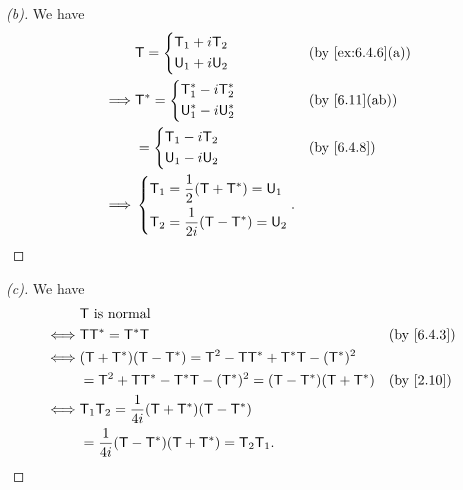 \begin{proof}[(b)]
	We have
	\begin{align*}
		         & \T = \begin{dcases}
			                \T_1 + i \T_2 \\
			                \U_1 + i \U_2
		                \end{dcases}                      &  & \by{ex:6.4.6}[a] \\
		\implies & \T^* = \begin{dcases}
			                  \T_1^* - i \T_2^* \\
			                  \U_1^* - i \U_2^*
		                  \end{dcases}                    &  & \by{6.11}[ab]    \\
		         & = \begin{dcases}
			             \T_1 - i \T_2 \\
			             \U_1 - i \U_2
		             \end{dcases}                         &  & \by{6.4.8}       \\
		\implies & \begin{dcases}
			           \T_1 = \frac{1}{2} (\T + \T^*) = \U_1 \\
			           \T_2 = \frac{1}{2i} (\T - \T^*) = \U_2
		           \end{dcases}.
	\end{align*}
\end{proof}

\begin{proof}[(c)]
	We have
	\begin{align*}
		     & \T \text{ is normal}                                                            \\
		\iff & \T \T^* = \T^* \T                                               &  & \by{6.4.3} \\
		\iff & (\T + \T^*) (\T - \T^*) = \T^2 - \T \T^* + \T^* \T - (\T^*)^2                   \\
		     & = \T^2 + \T \T^* - \T^* \T - (\T^*)^2 = (\T - \T^*) (\T + \T^*) &  & \by{2.10}  \\
		\iff & \T_1 \T_2 = \frac{1}{4i} (\T + \T^*) (\T - \T^*)                                \\
		     & = \frac{1}{4i} (\T - \T^*) (\T + \T^*) = \T_2 \T_1.
	\end{align*}
\end{proof}

